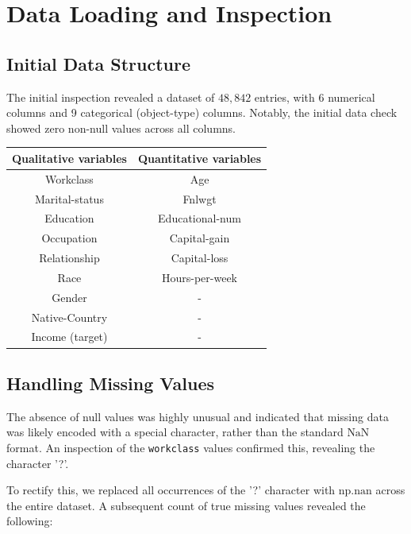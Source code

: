 \chapter{Data Loading and Inspection}
\label{cp:dli}

\section{Initial Data Structure}
The initial inspection revealed a dataset of $48,842$ entries, with 6 numerical columns and 9 categorical (object-type) columns. Notably, the initial data check showed zero non-null values across all columns.


\vspace{1 \baselineskip}
\begin{center}
\begin{tabular}{||c | c||} 
 \hline
 Qualitative variables & Quantitative variables \\ [1 ex] 
 \hline\hline
 Workclass & Age \\ [1ex] 
 \hline
 Marital-status & Fnlwgt \\ [1ex] 
 \hline
 Education & Educational-num \\ [1ex] 
 \hline
 Occupation & Capital-gain  \\ [1ex] 
 \hline
 Relationship & Capital-loss  \\ [1ex] 
 \hline
 Race & Hours-per-week  \\ [1ex] 
 \hline
 Gender & -  \\ [1ex] 
 \hline
 Native-Country & -  \\ [1ex] 
 \hline
 Income (target) & -  \\ [1ex] 
 \hline
\end{tabular}
\end{center}


\vspace{1 \baselineskip}
\section{Handling Missing Values}
\label{sec:handling_missing}
The absence of null values was highly unusual and indicated that missing data was likely encoded with a special character, rather than the standard $\text{NaN}$ format. An inspection of the \texttt{workclass} values confirmed this, revealing the character '?'.

To rectify this, we replaced all occurrences of the '?' character with $\text{np.nan}$ across the entire dataset. A subsequent count of true missing values revealed the following:

